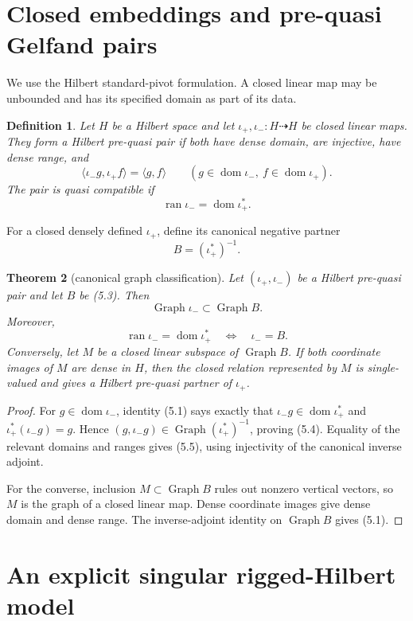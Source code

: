 \documentclass[11pt]{article}
\newtheorem{theorem}{Theorem}[section]
\newtheorem{definition}[theorem]{Definition}
\newcommand{\dom}{\operatorname{dom}}
\newcommand{\ran}{\operatorname{ran}}
\newcommand{\Graph}{\operatorname{Graph}}
\newcommand{\ip}[2]{\langle #1,#2\rangle}
\begin{document}
\section{Closed embeddings and pre-quasi Gelfand pairs}\label{sec:gelfand}

We use the Hilbert standard-pivot formulation.  A closed linear map may be
unbounded and has its specified domain as part of its data.

\begin{definition}\label{def:prequasi}
Let \(H\) be a Hilbert space and let
\(\iota_+,\iota_-:H\dashrightarrow H\) be closed linear maps.  They form a
\emph{Hilbert pre-quasi pair} if both have dense domain, are injective, have
dense range, and
\[
  \ip{\iota_-g}{\iota_+f}=\ip{g}{f}
  \qquad
  (g\in\dom\iota_-,\ f\in\dom\iota_+).
  \tag{5.1}
\]
The pair is \emph{quasi compatible} if
\[
  \ran\iota_-=\dom\iota_+^*.
  \tag{5.2}
\]
\end{definition}

For a closed densely defined \(\iota_+\), define its canonical negative
partner
\[
  B=(\iota_+^*)^{-1}.
  \tag{5.3}
\]

\begin{theorem}[canonical graph classification]\label{thm:classification}
Let \((\iota_+,\iota_-)\) be a Hilbert pre-quasi pair and let \(B\) be
(5.3).  Then
\[
  \Graph\iota_-\subset\Graph B.
  \tag{5.4}
\]
Moreover,
\[
  \ran\iota_-=\dom\iota_+^*
  \quad\Longleftrightarrow\quad
  \iota_-=B.
  \tag{5.5}
\]
Conversely, let \(M\) be a closed linear subspace of \(\Graph B\).  If both
coordinate images of \(M\) are dense in \(H\), then the closed relation
represented by \(M\) is single-valued and gives a Hilbert pre-quasi partner
of \(\iota_+\).
\end{theorem}

\begin{proof}
For \(g\in\dom\iota_-\), identity (5.1) says exactly that
\(\iota_-g\in\dom\iota_+^*\) and
\(\iota_+^*(\iota_-g)=g\).  Hence
\((g,\iota_-g)\in\Graph(\iota_+^*)^{-1}\), proving (5.4).
Equality of the relevant domains and ranges gives (5.5), using injectivity of
the canonical inverse adjoint.

For the converse, inclusion \(M\subset\Graph B\) rules out nonzero vertical
vectors, so \(M\) is the graph of a closed linear map.  Dense coordinate
images give dense domain and dense range.  The inverse-adjoint identity on
\(\Graph B\) gives (5.1).
\end{proof}

\section{An explicit singular rigged-Hilbert model}\label{sec:model}
\end{document}
